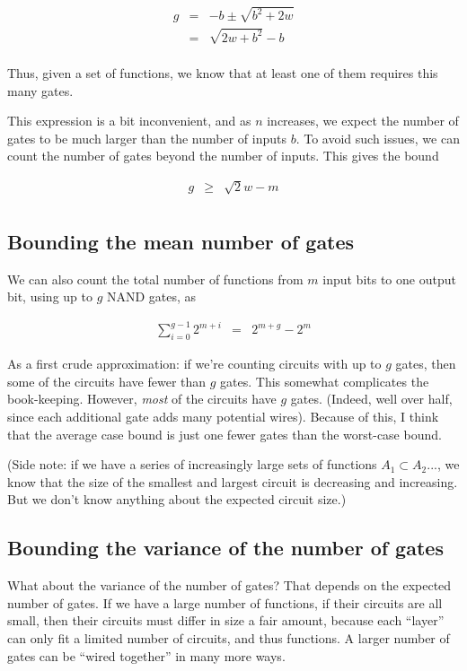 \documentclass[12pt]{article}
\theoremstyle{definition}
\begin{document}
\begin{eqnarray*}
g & = & -b \pm \sqrt{ b^2 + 2w} \\
  & = & {\sqrt {2w + b^2}} - b \\
\end{eqnarray*}

Thus, given a set of functions, we know that at least one of them requires
this many gates.

This expression is a bit inconvenient, and as $n$ increases, we
expect the number of gates to be much larger than the number of
inputs $b$. To avoid such issues, we can count the number of gates
beyond the number of inputs. This gives the bound

\begin{eqnarray*}
g & \ge & {\sqrt 2w} - m \\
\end{eqnarray*}


\subsection{Bounding the mean number of gates}

We can also count the total number of functions from $m$ input bits to one
output bit, using up to $g$ NAND gates, as

\begin{eqnarray*}
\sum_{i=0}^{g-1} 2^{m+i} & = & 2^{m+g} - 2^m
\end{eqnarray*}

As a first crude approximation:
if we're counting circuits with up to $g$ gates, then some of the circuits
have fewer than $g$ gates. This somewhat complicates the book-keeping.
However, {\em most} of the
circuits have $g$ gates. (Indeed, well over half, since each additional
gate adds many potential wires). Because of this, I think that the
average case bound is just one fewer gates than the worst-case bound.

(Side note: if we have a series of increasingly large
sets of functions
$A_1 \subset A_2 ...$, we know that the size of the smallest and
largest circuit is decreasing and increasing. But we don't know
anything about the expected circuit size.)

\subsection{Bounding the variance of the number of gates}

What about the variance of the number of gates? That depends on the
expected number of gates. If we have a large number of functions,
if their circuits are all small, then their circuits must differ in
size a fair amount, because each ``layer'' can only fit a limited
number of circuits, and thus functions. A larger number of gates
can be ``wired together'' in many more ways.
\end{document}
